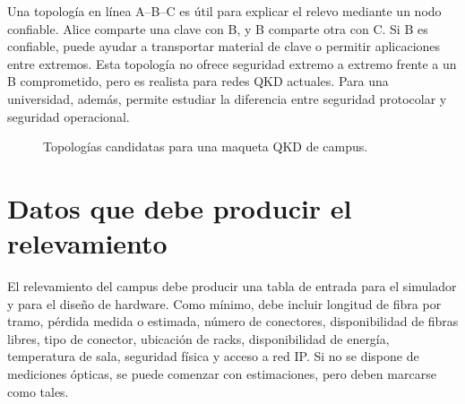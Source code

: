 Una topología en línea A--B--C es útil para explicar el relevo mediante un nodo confiable. Alice comparte una clave con B, y B comparte otra con C. Si B es confiable, puede ayudar a transportar material de clave o permitir aplicaciones entre extremos. Esta topología no ofrece seguridad extremo a extremo frente a un B comprometido, pero es realista para redes QKD actuales. Para una universidad, además, permite estudiar la diferencia entre seguridad protocolar y seguridad operacional.

\begin{figure}[H]
  \centering
  \caption{Topologías candidatas para una maqueta QKD de campus.}
  \label{fig:topologias_campus}
\end{figure}

\section{Datos que debe producir el relevamiento}

El relevamiento del campus debe producir una tabla de entrada para el simulador y para el diseño de hardware. Como mínimo, debe incluir longitud de fibra por tramo, pérdida medida o estimada, número de conectores, disponibilidad de fibras libres, tipo de conector, ubicación de racks, disponibilidad de energía, temperatura de sala, seguridad física y acceso a red IP. Si no se dispone de mediciones ópticas, se puede comenzar con estimaciones, pero deben marcarse como tales.

